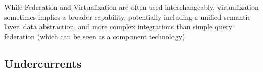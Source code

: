 While Federation and Virtualization are often used
interchangeably, virtualization sometimes implies
a broader capability, potentially including a
unified semantic layer, data abstraction,
and more complex integrations than simple query
federation (which can be seen as a component technology).



















 
\subsection*{Undercurrents}








